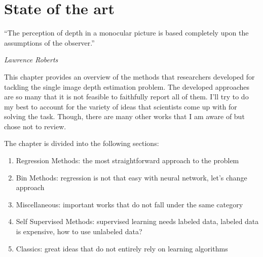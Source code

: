 \chapter{State of the art}
\label{c:sota}

\epigraph{\enquote{The perception of depth in a monocular picture is based completely upon the assumptions of the observer.}}{\emph{Lawrence Roberts}}

This chapter provides an overview of the methods that researchers developed for tackling the single image depth estimation problem.
The developed approaches are so many that it is not feasible to faithfully report all of them.
I'll try to do my best to account for the variety of ideas that scientists come up with for solving the task.
Though, there are many other works that I am aware of but chose not to review.

The chapter is divided into the following sections:
\begin{enumerate}
    \item{Regression Methods: the most straightforward approach to the problem}
    \item{Bin Methods: regression is not that easy with neural network, let's change approach}
    \item{Miscellaneous: important works that do not fall under the same category}
    \item{Self Supervised Methods: supervised learning needs labeled data, labeled data is expensive, how to use unlabeled data?}
    \item{Classics: great ideas that do not entirely rely on learning algorithms}
\end{enumerate}

%








